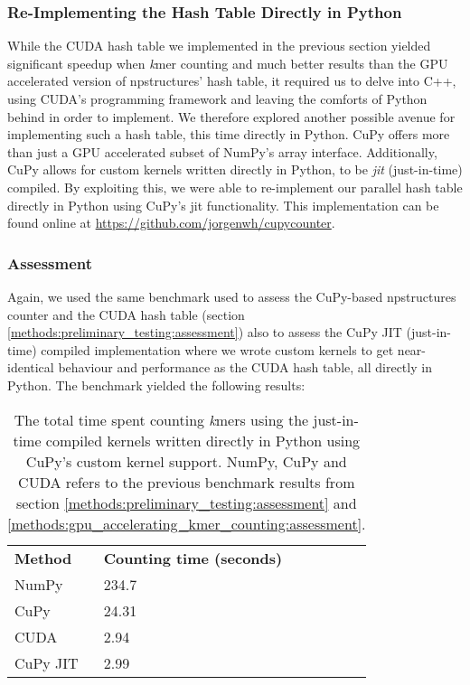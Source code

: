 \subsubsection{Re-Implementing the Hash Table Directly in Python} \label{methods:gpu_accelerating_kmer_counting_jit}
While the CUDA hash table we implemented in the previous section yielded significant speedup when \textit{k}mer counting and much better results than the GPU accelerated version of npstructures' hash table, it required us to delve into C++, using CUDA's programming framework and leaving the comforts of Python behind in order to implement.
We therefore explored another possible avenue for implementing such a hash table, this time directly in Python.
CuPy offers more than just a GPU accelerated subset of NumPy's array interface.
Additionally, CuPy allows for custom kernels written directly in Python, to be \textit{jit} (just-in-time) compiled.
By exploiting this, we were able to re-implement our parallel hash table directly in Python using CuPy's jit functionality.
This implementation can be found online at \url{https://github.com/jorgenwh/cupycounter}.

\subsubsection{Assessment}
Again, we used the same benchmark used to assess the CuPy-based npstructures counter and the CUDA hash table (section \ref{methods:preliminary_testing:assessment}) also to assess the CuPy JIT (just-in-time) compiled implementation where we wrote custom kernels to get near-identical behaviour and performance as the CUDA hash table, all directly in Python.
The benchmark yielded the following results:
\begin{table}[H]
\begin{center}
\begin{tabular}{lllll}
\multicolumn{1}{l|}{\textbf{Method}} & \multicolumn{1}{l}{\textbf{Counting time (seconds)}} &  \\ \cline{1-2}
\multicolumn{1}{l|}{NumPy} & \multicolumn{1}{l}{234.7} &  \\
\multicolumn{1}{l|}{CuPy} & \multicolumn{1}{l}{24.31} &  \\
\multicolumn{1}{l|}{CUDA} & \multicolumn{1}{l}{2.94} &  \\
\multicolumn{1}{l|}{CuPy JIT} & \multicolumn{1}{l}{2.99} &  \\
\end{tabular}
\end{center}
\caption{
  The total time spent counting \textit{k}mers using the just-in-time compiled kernels written directly in Python using CuPy's custom kernel support.
  NumPy, CuPy and CUDA refers to the previous benchmark results from section \ref{methods:preliminary_testing:assessment} and \ref{methods:gpu_accelerating_kmer_counting:assessment}.
}
\label{methods:gpu_accelerating_kmer_counting_jit:tables:benchmark}
\end{table}


